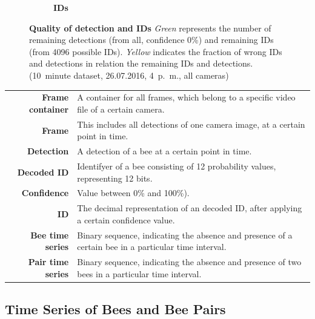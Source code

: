 \begin{figure}
\begin{subfigure}[b]{0.45\textwidth}
        \caption[IDs]{\textbf{IDs}}
        \label{fig:ids}
    \end{subfigure}
 	\caption[Quality of detection and IDs]{\textbf{Quality of detection and IDs} \emph{Green} represents the number of remaining detections (from all, confidence 0\%) and remaining IDs (from 4096 possible IDs). \emph{Yellow} indicates the fraction of wrong IDs and detections in relation the remaining IDs and detections. (10~minute dataset, 26.07.2016, 4~p.~m., all cameras)}
 	\label{fig:remainingVSquality}
\end{figure}

 
\begin{table}[!b]
\colorbox{usethiscolorhere}{
\centering
\begin{tabularx}{\textwidth}{@{} r Y @{}}
	\textbf{Frame container} &
	A container for all frames, which belong to a specific video file of a certain camera.\\
	\textbf{Frame} &
	This includes all detections of one camera image, at a certain point in time.\\
	\textbf{Detection} &
	A detection of a bee at a certain point in time.\\
	\textbf{Decoded ID} &
	Identifyer of a bee consisting of 12 probability values, representing 12 bits.\\
	\textbf{Confidence} &
	Value between 0\% and 100\%).\\
	\textbf{ID} &
	The decimal representation of an decoded ID, after applying a certain confidence value.\\
	\textbf{Bee time series} & Binary sequence, indicating the absence and presence of a certain bee in a particular time interval.\\
	\textbf{Pair time series} & Binary sequence, indicating the absence and presence of two bees in a particular time interval.\\
\end{tabularx}
}
\end{table}

\subsection{Time Series of Bees and Bee Pairs}
\label{subsec:tracking}


